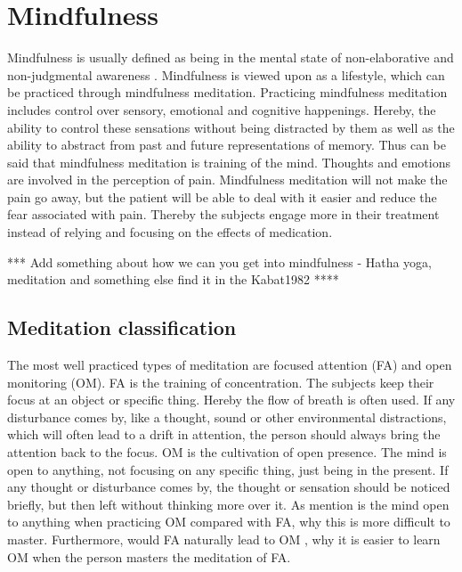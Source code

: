 \section{Mindfulness}
Mindfulness is usually defined as being in the mental state of non-elaborative and non-judgmental awareness \cite{Zeidan2012,Zeidan2016,Tang2017}. Mindfulness is viewed upon as a lifestyle, which can be practiced through mindfulness meditation. Practicing mindfulness meditation includes control over sensory, emotional and cognitive happenings. Hereby, the ability to control these sensations without being distracted by them as well as the ability to abstract from past and future representations of memory. Thus can be said that mindfulness meditation is training of the mind. \cite{Tang2017}
Thoughts and emotions are involved in the perception of pain.
Mindfulness meditation will not make the pain go away, but the patient will be able to deal with it easier and reduce the fear associated with pain. Thereby the subjects engage more in their treatment instead of relying and focusing on the effects of medication. \cite{Jacob2016}

*** Add something about how we can you get into mindfulness - Hatha yoga, meditation and something else find it in the Kabat1982 ****

\subsection{Meditation classification}
The most well practiced types of meditation are focused attention (FA) and open monitoring (OM).\cite{Zeidan2016} FA is the training of concentration. The subjects keep their focus at an object or specific thing. Hereby the flow of breath is often used.  If any disturbance comes by, like a thought, sound or other environmental distractions, which will often lead to a drift in attention, the person should always bring the attention back to the focus. \cite{Zeidan2016} OM is the cultivation of open presence. The mind is open to anything, not focusing on any specific thing, just being in the present. If any thought or disturbance comes by, the thought or sensation should be noticed briefly, but then left without thinking more over it. As mention is the mind open to anything when practicing OM compared with FA, why this is more difficult to master. Furthermore, would FA naturally lead to OM \cite{Perlman2016}, why it is easier to learn OM when the person masters the meditation of FA.\cite{Zeidan2016}



